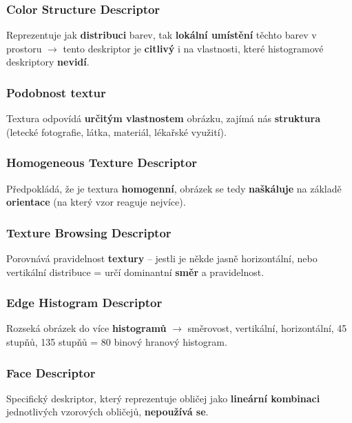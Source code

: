 \subsubsection*{Color Structure Descriptor}

Reprezentuje jak \textbf{distribuci} barev, tak \textbf{lokální umístění} těchto barev v prostoru $\to$ tento deskriptor je \textbf{citlivý} i na vlastnosti, které histogramové deskriptory \textbf{nevidí}.

\subsubsection*{Podobnost textur}

Textura odpovídá \textbf{určitým vlastnostem} obrázku, zajímá nás \textbf{struktura} (letecké fotografie, látka, materiál, lékařské využití).

\subsubsection*{Homogeneous Texture Descriptor}

Předpokládá, že je textura \textbf{homogenní}, obrázek se tedy \textbf{naškáluje} na základě \textbf{orientace} (na který vzor reaguje nejvíce).

\subsubsection*{Texture Browsing Descriptor}

Porovnává pravidelnost \textbf{textury} -- jestli je někde jasně horizontální, nebo vertikální distribuce = určí dominantní \textbf{směr} a pravidelnost.

\subsubsection*{Edge Histogram Descriptor}

Rozseká obrázek do více \textbf{histogramů} $\to$ směrovost, vertikální, horizontální, 45 stupňů, 135 stupňů = 80 binový hranový histogram.

\subsubsection*{Face Descriptor}

Specifický deskriptor, který reprezentuje obličej jako \textbf{lineární kombinaci} jednotlivých vzorových obličejů, \textbf{nepoužívá se}.
